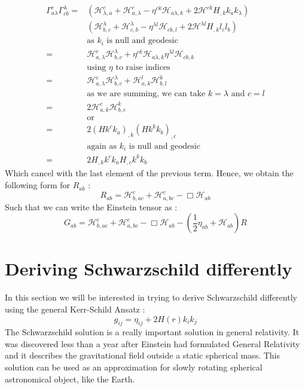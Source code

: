 \documentclass[a4paper,12pt]{article}
\theoremstyle{definition}
\begin{document}
\begin{equation}
\begin{split}
	\Gamma^c_{a\lambda}\Gamma^\lambda_{cb}=&(\mathcal{H}^c_{\lambda,a}+\mathcal{H}^c_{a,\lambda}-\eta^{ck}\mathcal{H}_{a\lambda,k}+2\mathcal{H}^{ck}H_{,k}k_ak_\lambda)\\
	&(\mathcal{H}^\lambda_{b,c}+\mathcal{H}^\lambda_{c,b}-\eta^{\lambda l}\mathcal{H}_{cb,l}+2\mathcal{H}^{\lambda l}H_{,k}l_cl_b)\\
	&\text{as $k_i$ is null and geodesic}\\
	=&\mathcal{H}^c_{a,\lambda}\mathcal{H}^\lambda_{b,c}+\eta^{ck}\mathcal{H}_{a\lambda,k}\eta^{\lambda l}\mathcal{H}_{cb,k}\\
	&\text{using $\eta$ to raise indices}\\
	=&\mathcal{H}^c_{a,\lambda}\mathcal{H}^\lambda_{b,c}+\mathcal{H}^{l}_{a,k}\mathcal{H}^k_{b,l}\\
	&\text{as we are summing, we can take $k=\lambda$ and $c=l$}\\
	=&2\mathcal{H}^c_{a,k}\mathcal{H}^k_{b,c}\\
	&\text{or}\\
	=&2(Hk^ck_a)_{,k}(Hk^k k_b)_{,c}\\
	&\text{again as $k_i$ is null and geodesic}\\
	=&2H_{,k}k^ck_aH_{,c}k^k k_b
\end{split}
\end{equation}
Which cancel with the last element of the previous term.
Hence, we obtain the following form for $R_{ab}$ :
\begin{equation}
	R_{ab}=\mathcal{H}^c_{b,ac}+\mathcal{H}^c_{a,bc}-\Box\mathcal{H}_{ab}
\end{equation}
Such that we can write the Einstein tensor as :
\begin{equation}
	G_{ab}=\mathcal{H}^c_{b,ac}+\mathcal{H}^c_{a,bc}-\Box\mathcal{H}_{ab}-(\frac{1}{2}\eta_{ab}+\mathcal{H}_{ab})R
\end{equation}

\section{Deriving Schwarzschild differently}
In this section we will be interested in trying to derive Schwarzschild differently using the general Kerr-Schild Ansatz :
\begin{equation}
	g_{ij}=\eta_{ij}+2H(r)k_ik_j
\end{equation}
The Schwarzschild solution is a really important solution in general relativity.
It was discovered less than a year after Einstein had formulated General Relativity and it describes the gravitational field outside a static spherical mass.
This solution can be used as an approximation for slowly rotating spherical astronomical object, like the Earth.
\end{document}
